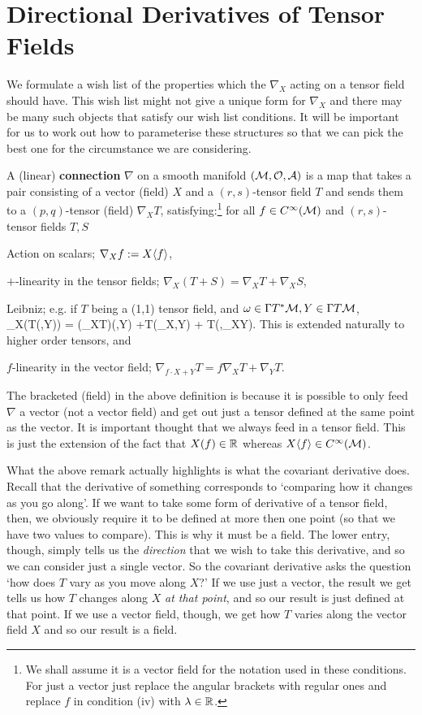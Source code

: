 \section{Directional Derivatives of Tensor Fields}

We formulate a wish list of the properties which the $\nabla_X$ acting on a tensor field should have. This wish list might not give a unique form for $\nabla_X$ and there may be many such objects that satisfy our wish list conditions. It will be important for us to work out how to parameterise these structures so that we can pick the best one for the circumstance we are considering. 

    A (linear) \textbf{connection} $\nabla$ on a smooth manifold $(\mathcal{M},\mathcal{O},\mathcal{A})$ is a map that takes a pair consisting of a vector (field) $X$ and a $(r,s)$-tensor field $T$ and sends them to a $(p,q)$-tensor (field) $\nabla_XT$, satisfying:\footnote{We shall assume it is a vector field for the notation used in these conditions. For just a vector just replace the angular brackets with regular ones and replace $f$ in condition (iv) with $\lambda\in\mathbb{R}$.} for all $f\in C^{\infty}(\mathcal{M})$ and $(r,s)$-tensor fields $T,S$
    \benr 
        \item Action on scalars; $\nabla_X f := X\langle f\rangle$, 
        \item $+$-linearity in the tensor fields; $\nabla_X(T+S) = \nabla_XT + \nabla_XS$, 
        \item Leibniz; e.g. if $T$ being a (1,1) tensor field, and $\omega\in\Gamma T^*\mathcal{M}, Y\in \Gamma T\mathcal{M}$,
        \bse 
            \nabla_X\big(T(\omega,Y)\big) = (\nabla_XT)(\omega,Y) +T\big(\nabla_X\omega,Y\big) + T\big(\omega,\nabla_XY\big).
        \ese 
        This is extended naturally to higher order tensors, and 
        \item $f$-linearity in the vector field; $\nabla_{f\cdot X+ Y} T = f\nabla_XT + \nabla_YT$.
    \een
\ed

\br 
    The bracketed (field) in the above definition is because it is possible to only feed $\nabla$ a vector (not a vector field) and get out just a tensor defined at the same point as the vector. It is important thought that we always feed in a tensor field. This is just the extension of the fact that $X(f) \in \mathbb{R}$ whereas $X\langle f\rangle \in C^{\infty}(\mathcal{M})$. 
\er 

What the above remark actually highlights is what the covariant derivative does. Recall that the derivative of something corresponds to `comparing how it changes as you go along'. If we want to take some form of derivative of a tensor field, then, we obviously require it to be defined at more then one point (so that we have two values to compare). This is why it must be a field. The lower entry, though, simply tells us the \textit{direction} that we wish to take this derivative, and so we can consider just a single vector. So the covariant derivative asks the question `how does $T$ vary as you move along $X$?' If we use just a vector, the result we get tells us how $T$ changes along $X$ \textit{at that point}, and so our result is just defined at that point. If we use a vector field, though, we get how $T$ varies along the vector field $X$ and so our result is a field. 

